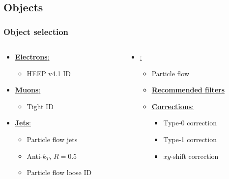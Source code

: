 \documentclass[bigger]{beamer}
\providecommand{\alert}[1]{\textbf{#1}}
\begin{document}
\subsection{Objects}
\label{sec-1-5}
\begin{frame}
\frametitle{Object selection}
\label{sec-1-5-1}
\begin{columns}
\begin{column}{0.5\textwidth}
\label{sec-1-5-1-1}

\begin{itemize}
\item \href{https://twiki.cern.ch/twiki/bin/viewauth/CMS/HEEPElectronID}{\alert{Electrons}:} 
\begin{itemize}
\item HEEP v4.1 ID
\end{itemize}
\item \href{https://twiki.cern.ch/twiki/bin/view/CMSPublic/SWGuideMuonId\#Tight_Muon}{\alert{Muons}:}
\begin{itemize}
\item Tight ID
\end{itemize}
\item \href{https://twiki.cern.ch/twiki/bin/viewauth/CMS/JetID\#Recommendations_for_7_TeV_data_a}{\alert{Jets}:}
\begin{itemize}
\item Particle flow jets
\item Anti-$k_{T}$, $R = 0.5$
\item Particle flow loose ID 
\end{itemize}
\end{itemize}
\end{column}
\begin{column}{0.5\textwidth}
\label{sec-1-5-1-2}

\begin{itemize}
\item \href{https://twiki.cern.ch/twiki/bin/view/CMSPublic/WorkBookMetAnalysis\#7_7_6_MET_Corrections}{\alert{\met}:}
\begin{itemize}
\item Particle flow \met
\item \href{https://twiki.cern.ch/twiki/bin/viewauth/CMS/MissingETOptionalFilters\#Analysis_Recommendations_for_any}{\alert{Recommended filters}}
\item \href{https://twiki.cern.ch/twiki/bin/view/CMSPublic/WorkBookMetAnalysis\#7_7_6_MET_Corrections}{\alert{Corrections}:}
\begin{itemize}
\item Type-0 correction
\item Type-1 correction
\item $xy$-shift correction
\end{itemize}
\end{itemize}
\end{itemize}
\end{column}
\end{columns}
\end{frame}
\end{document}
